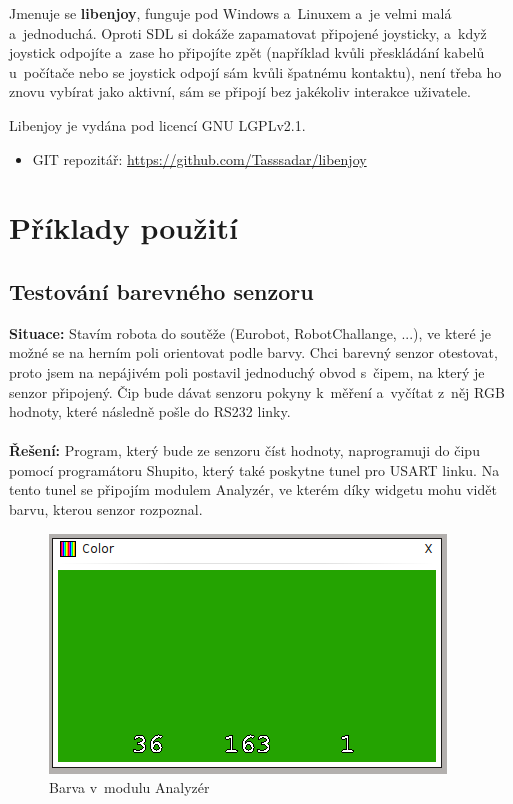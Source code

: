 \documentclass[12pt, a4paper, oneside]{article}
\begin{document}
Jmenuje se {\bf libenjoy}, funguje pod Windows a~Linuxem a~je velmi malá a~jednoduchá. Oproti SDL si dokáže zapamatovat připojené joysticky, a~když joystick odpojíte a~zase ho připojíte zpět (například kvůli přeskládání kabelů u~počítače nebo se joystick odpojí sám kvůli špatnému kontaktu), není třeba ho znovu vybírat jako aktivní, sám se připojí bez jakékoliv interakce uživatele.

Libenjoy je vydána pod licencí GNU LGPLv2.1\cite{lgpl}.

\begin{itemize}
\item GIT repozitář: \url{https://github.com/Tasssadar/libenjoy}
\end{itemize}

\newpage
\section{Příklady použití}
\subsection{Testování barevného senzoru}
{\bf Situace:} Stavím robota do soutěže (Eurobot, RobotChallange, ...), ve které je možné se na herním poli orientovat podle barvy. Chci barevný senzor otestovat, proto jsem na nepájivém poli postavil jednoduchý obvod s~čipem, na který je senzor připojený. Čip bude dávat senzoru pokyny k~měření a~vyčítat z~něj RGB hodnoty, které následně pošle do RS232 linky.\\
\\
{\bf Řešení:} Program, který bude ze senzoru číst hodnoty, naprogramuji do čipu pomocí programátoru Shupito, který také poskytne tunel pro USART linku. Na tento tunel se připojím modulem Analyzér, ve kterém díky widgetu  mohu vidět barvu, kterou senzor rozpoznal.

\begin{figure}[h]
\begin{center}
\includegraphics{img/use_color.png}
\caption{Barva v~modulu Analyzér}
\end{center}
\end{figure}
\end{document}
